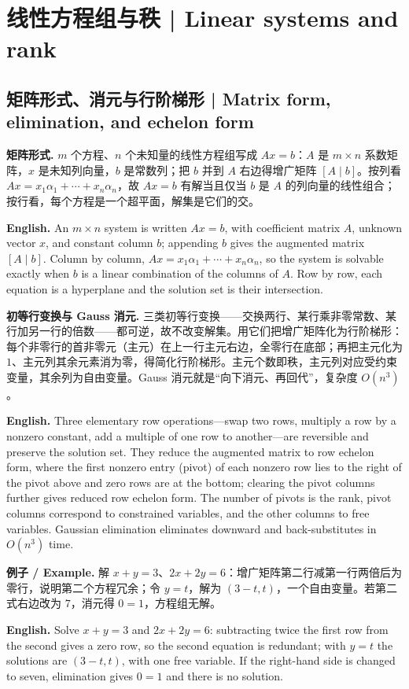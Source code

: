 \documentclass[UTF8,11pt,a4paper]{ctexart}
\newcommand{\EN}[1]{\par\noindent\textbf{English.} #1\par}
\newcommand{\EX}[2]{\par\noindent\textbf{例子 / Example.} #1\par\EN{#2}}
\begin{document}
\section{线性方程组与秩 | Linear systems and rank}
\subsection{矩阵形式、消元与行阶梯形 | Matrix form, elimination, and echelon form}
\noindent\textbf{矩阵形式.} $m$ 个方程、$n$ 个未知量的线性方程组写成 $Ax=b$：$A$ 是 $m\times n$ 系数矩阵，$x$ 是未知列向量，$b$ 是常数列；把 $b$ 并到 $A$ 右边得增广矩阵 $[A\mid b]$。按列看 $Ax=x_1\alpha_1+\cdots+x_n\alpha_n$，故 $Ax=b$ 有解当且仅当 $b$ 是 $A$ 的列向量的线性组合；按行看，每个方程是一个超平面，解集是它们的交。
\EN{An $m\times n$ system is written $Ax=b$, with coefficient matrix $A$, unknown vector $x$, and constant column $b$; appending $b$ gives the augmented matrix $[A\mid b]$. Column by column, $Ax=x_1\alpha_1+\cdots+x_n\alpha_n$, so the system is solvable exactly when $b$ is a linear combination of the columns of $A$. Row by row, each equation is a hyperplane and the solution set is their intersection.}
\noindent\textbf{初等行变换与 Gauss 消元.} 三类初等行变换——交换两行、某行乘非零常数、某行加另一行的倍数——都可逆，故不改变解集。用它们把增广矩阵化为行阶梯形：每个非零行的首非零元（主元）在上一行主元右边，全零行在底部；再把主元化为 $1$、主元列其余元素消为零，得简化行阶梯形。主元个数即秩，主元列对应受约束变量，其余列为自由变量。Gauss 消元就是“向下消元、再回代”，复杂度 $O(n^3)$。
\EN{Three elementary row operations—swap two rows, multiply a row by a nonzero constant, add a multiple of one row to another—are reversible and preserve the solution set. They reduce the augmented matrix to row echelon form, where the first nonzero entry (pivot) of each nonzero row lies to the right of the pivot above and zero rows are at the bottom; clearing the pivot columns further gives reduced row echelon form. The number of pivots is the rank, pivot columns correspond to constrained variables, and the other columns to free variables. Gaussian elimination eliminates downward and back-substitutes in $O(n^3)$ time.}
\EX{解 $x+y=3$、$2x+2y=6$：增广矩阵第二行减第一行两倍后为零行，说明第二个方程冗余；令 $y=t$，解为 $(3-t,t)$，一个自由变量。若第二式右边改为 $7$，消元得 $0=1$，方程组无解。}{Solve $x+y=3$ and $2x+2y=6$: subtracting twice the first row from the second gives a zero row, so the second equation is redundant; with $y=t$ the solutions are $(3-t,t)$, with one free variable. If the right-hand side is changed to seven, elimination gives $0=1$ and there is no solution.}
\end{document}
